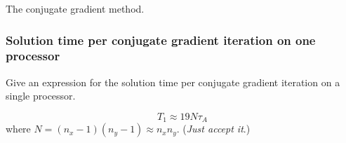 \begin{algorithm}[H]
  \caption{The conjugate gradient method.}
\end{algorithm}

\subsubsection{Solution time per conjugate gradient iteration on one processor} %
\label{ssub:solution_per_conjugate_gradient_iteration_on_one_processor}

\begin{question}
  Give an expression for the solution time per conjugate gradient iteration on a single processor.
\end{question}

\begin{equation}
  T_1 \approx 19 N \tau_A
\end{equation}
where $N=(n_x-1)(n_y-1) \approx n_x n_y$. (\emph{Just accept it}.)



